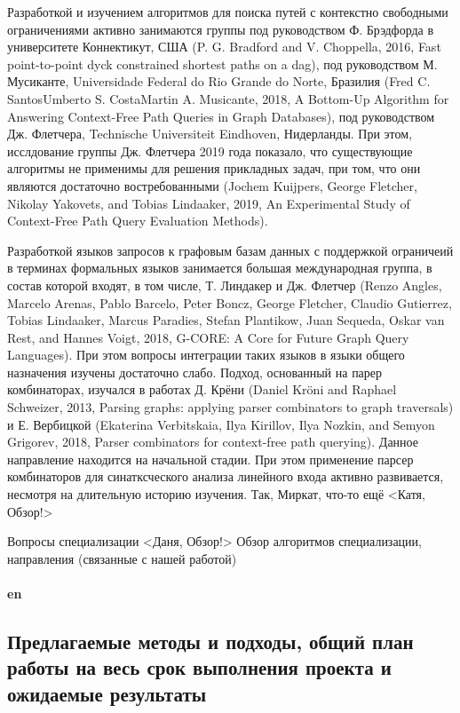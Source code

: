 \documentclass[12pt]{article}  %
\theoremstyle{remark}
\begin{document}
Разработкой и изучением алгоритмов для поиска путей с контекстно свободными ограничениями активно занимаются группы под руководством Ф. Брэдфорда в университете Коннектикут, США (P. G. Bradford and V. Choppella, 2016, Fast point-to-point dyck constrained shortest paths on a
dag), под руководством М. Мусиканте, Universidade Federal do Rio Grande do Norte, Бразилия (Fred C. SantosUmberto S. CostaMartin A. Musicante, 2018, A Bottom-Up Algorithm for Answering Context-Free Path Queries in Graph Databases), под руководством Дж. Флетчера, Technische Universiteit Eindhoven, Нидерланды. При этом, исслдование группы Дж. Флетчера 2019 года показало, что существующие алгоритмы не применимы для решения прикладных задач, при том, что они являются достаточно востребованными (Jochem Kuijpers, George Fletcher, Nikolay Yakovets, and Tobias Lindaaker, 2019, An Experimental Study of Context-Free Path Query Evaluation Methods).

Разработкой языков запросов к графовым базам данных с поддержкой ограничеий в терминах формальных языков занимается большая международная группа, в состав которой входят, в том числе, Т. Линдакер и Дж. Флетчер (Renzo Angles, Marcelo Arenas, Pablo Barcelo, Peter Boncz, George Fletcher, Claudio Gutierrez, Tobias Lindaaker, Marcus Paradies, Stefan Plantikow, Juan Sequeda, Oskar van Rest, and Hannes Voigt, 2018, G-CORE: A Core for Future Graph Query Languages). При этом вопросы интеграции таких языков в языки общего назначения изучены достаточно слабо. Подход, основанный на парер комбинаторах, изучался в работах Д. Крёни (Daniel Kröni and Raphael Schweizer, 2013, Parsing graphs: applying parser combinators to graph traversals) и Е. Вербицкой (Ekaterina Verbitskaia, Ilya Kirillov, Ilya Nozkin, and Semyon Grigorev, 2018, Parser combinators for context-free path querying). Данное направление находится на начальной стадии. При этом применение парсер комбинаторов для синатксческого анализа линейного входа активно развивается, несмотря на длительную историю изучения. Так, Миркат, что-то ещё {\huge<Катя, Обзор!>}

Вопросы специализации {\huge<Даня, Обзор!>} Обзор алгоритмов специализации, направления (связанные с нашей работой)
\\
\\
\textbf{en}\\

\subsection{Предлагаемые методы и подходы, общий план работы на весь срок выполнения проекта и ожидаемые результаты }
\end{document}
